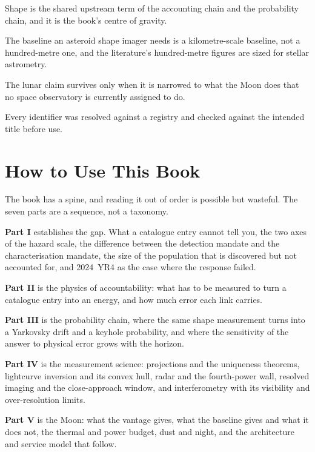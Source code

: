 \begin{keytakeaways}
\item Shape is the shared upstream term of the accounting chain and the
probability chain, and it is the book's centre of gravity.
\item The baseline an asteroid shape imager needs is a kilometre-scale
baseline, not a hundred-metre one, and the literature's hundred-metre figures
are sized for stellar astrometry.
\item The lunar claim survives only when it is narrowed to what the Moon does
that no space observatory is currently assigned to do.
\item Every identifier was resolved against a registry and checked against the
intended title before use.
\end{keytakeaways}

\chapter*{How to Use This Book}
\thispagestyle{plain}

The book has a spine, and reading it out of order is possible but wasteful.
The seven parts are a sequence, not a taxonomy.

\textbf{Part I} establishes the gap. What a catalogue entry cannot tell you,
the two axes of the hazard scale, the difference between the detection mandate
and the characterisation mandate, the size of the population that is discovered
but not accounted for, and 2024~YR4 as the case where the response failed.

\textbf{Part II} is the physics of accountability: what has to be measured to
turn a catalogue entry into an energy, and how much error each link carries.

\textbf{Part III} is the probability chain, where the same shape measurement
turns into a Yarkovsky drift and a keyhole probability, and where the
sensitivity of the answer to physical error grows with the horizon.

\textbf{Part IV} is the measurement science: projections and the uniqueness
theorems, lightcurve inversion and its convex hull, radar and the fourth-power
wall, resolved imaging and the close-approach window, and interferometry with
its visibility and over-resolution limits.

\textbf{Part V} is the Moon: what the vantage gives, what the baseline gives
and what it does not, the thermal and power budget, dust and night, and the
architecture and service model that follow.

